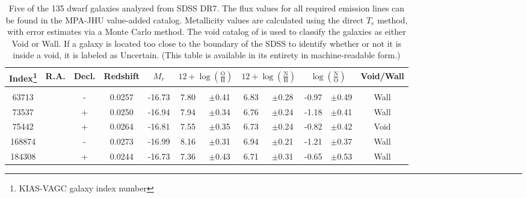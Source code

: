 \begin{sidewaystable}
\centering

\begin{tabu} to \textwidth {cccccccccccc}
Index\footnote[1]{KIAS-VAGC galaxy index number} & R.A. & Decl. & Redshift & $M_r$ &  &  &  & Void/Wall \\
\hline \\
63713 &  & - & 0.0257 & -16.73 & 7.80 & $\pm$0.41 & 6.83 & $\pm$0.28 & -0.97 & $\pm$0.49 & Wall \\
73537 &  & + & 0.0250 & -16.94 & 7.94 & $\pm$0.34 & 6.76 & $\pm$0.24 & -1.18 & $\pm$0.41 & Wall \\
75442 &  & + & 0.0264 & -16.81 & 7.55 & $\pm$0.35 & 6.73 & $\pm$0.24 & -0.82 & $\pm$0.42 & Void \\
168874 &  & - & 0.0273 & -16.99 & 8.16 & $\pm$0.31 & 6.94 & $\pm$0.21 & -1.21 & $\pm$0.37 & Wall \\
184308 &  & + & 0.0244 & -16.73 & 7.36 & $\pm$0.43 & 6.71 & $\pm$0.31 & -0.65 & $\pm$0.53 & Wall\\
\end{tabu}

\caption[Analyzed dwarf galaxies]{Five of the 135 dwarf galaxies analyzed from SDSS DR7.  The flux values for all required emission lines can be found in the MPA-JHU value-added catalog.  Metallicity values are calculated using the direct $T_e$ method, with error estimates via a Monte Carlo method.  The void catalog of \cite{Pan12} is used to classify the galaxies as either Void or Wall.  If a galaxy is located too close to the boundary of the SDSS to identify whether or not it is inside a void, it is labeled as Uncertain.  (This table is available in its entirety in machine-readable form.)}

\label{tab:Results_P2}

\end{sidewaystable}
